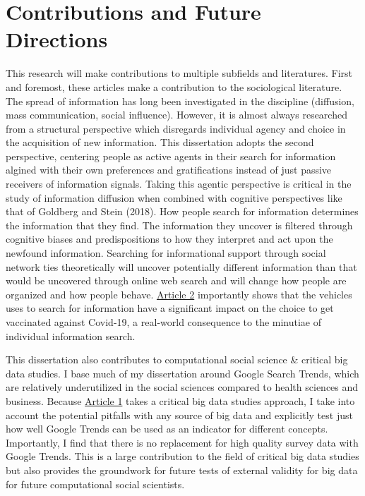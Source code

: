 \section{Contributions and Future Directions}

This research will make contributions to multiple subfields and literatures. 
First and foremost, these articles make a contribution to the sociological literature.
The spread of information has long been investigated in the discipline (diffusion, mass
communication, social influence). However, it is almost always researched from a structural
perspective which disregards individual agency and choice in the
acquisition of new information. This dissertation adopts the second perspective,
centering people as active agents in their search for information algined
with their own preferences and gratifications instead of just
passive receivers of information signals.
Taking this agentic perspective is critical in the study of information
diffusion when combined with cognitive perspectives like that of
Goldberg and Stein (2018). How people search for information determines
the information that they find. The information they uncover is filtered
through cognitive biases and predispositions to how they interpret and
act upon the newfound information. Searching for informational support
through social network ties theoretically will uncover potentially
different information than that would be uncovered through online web
search and will change how people are organized and how people behave.
\hyperlink{paper-2}{Article 2} importantly shows that 
the vehicles uses to search for information have a significant impact on the choice to get vaccinated against Covid-19, a real-world consequence to the minutiae of individual information search. 

This dissertation also contributes to computational social science \&
critical big data studies. I base much of my dissertation around Google
Search Trends, which are relatively underutilized in the social sciences
compared to health sciences and business. Because \hyperlink{paper-1}{Article 1} 
takes a critical big data studies approach, I take into account the potential
pitfalls with any source of big data \citep{mcfarlandBigDataDanger2015} and explicitly
test just how well Google Trends can be used as an indicator for different concepts. 
Importantly, I find that there is no replacement for high quality survey data with Google Trends. 
This is a large contribution to the field of critical big data studies but also provides
the groundwork for future tests of external validity for big data for future computational
social scientists.

